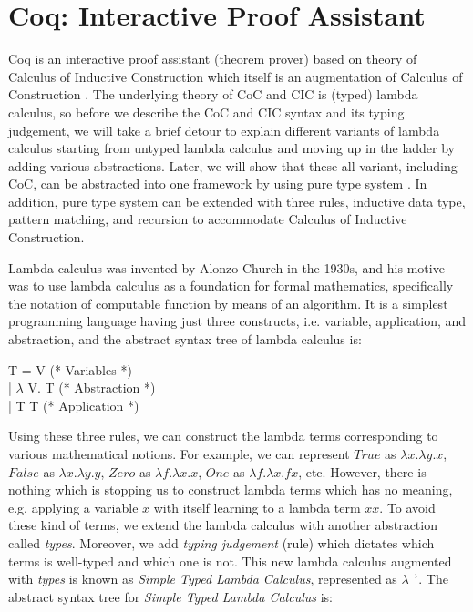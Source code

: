 \section{Coq: Interactive Proof Assistant}
\label{sec:problemstatement}
Coq  is an interactive proof assistant (theorem prover) based on
theory of Calculus of 
Inductive Construction \citep{Paulin-Mohring:1993:IDS:645891.671440} which itself is an 
augmentation of Calculus of Construction 
\citep{Coquand:1988:CC:47724.47725}.  
The underlying theory of CoC and CIC is (typed) lambda calculus, so 
before we describe the CoC and CIC syntax and its typing judgement, 
we will take a brief detour to explain 
different variants of lambda calculus starting from 
untyped lambda calculus and moving up in the ladder by 
adding various abstractions. Later, we will show that 
these all variant, including CoC, can be abstracted into one 
framework by using pure type system \citep{berardi1988towards} 
\citep{Barendregt:1993:LCT:162552.162561}.  
In addition, 
pure type system can be extended with three rules, 
inductive data type, pattern matching, and recursion 
to accommodate Calculus of Inductive Construction. 


Lambda calculus was invented by Alonzo Church in the 1930s, 
and his motive was to use lambda calculus as a foundation 
for formal mathematics, specifically the notation of 
computable function by means of an algorithm.  
It is a simplest programming language having just 
three constructs, i.e. variable, application, and abstraction, 
and the abstract syntax tree of lambda calculus is:
\begin{displayquote}

T = V (* Variables *) \\
   | $\lambda$ V. T (* Abstraction *) \\
   | T T       (* Application *)

\end{displayquote}

Using these three rules, we can construct the lambda terms corresponding to 
various mathematical notions. For example, we can represent
$True$ as $\lambda x. \lambda y. x$, $False$ as $\lambda x. \lambda y. y$,
$Zero$ as $\lambda f.\lambda x. x$,  $One$ as $\lambda f.\lambda x. f x$, etc. 
However, there is nothing which is stopping us to construct lambda terms which 
has no meaning, e.g. applying a variable $x$ with itself learning to a lambda 
term $x x$. To avoid these kind of terms, we extend the lambda calculus with 
another abstraction called \textit{types}. Moreover, we add \textit{typing judgement} (rule) 
which dictates which terms is well-typed and which one is not.  This new 
lambda calculus augmented with \textit{types} is known as 
\textit{Simple Typed Lambda Calculus}, represented as $\lambda^{\to}$. 
The abstract syntax tree for \textit{Simple Typed Lambda Calculus} is:


